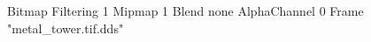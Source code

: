 {Bitmap
	{Filtering 1}
	{Mipmap 1}
	{Blend none}
	{AlphaChannel 0}
	{Frame "metal_tower.tif.dds"}
}
